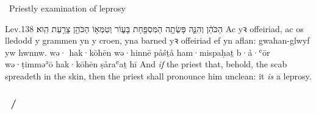 \begin{frame}{\ex\ Priestly examination of leprosy}
	\begin{example}{Lev.}{13}{8}{}{}
		\quoling
		{ הַכֹּהֵ֔ן וְהִנֵּ֛ה פָּשְׂתָ֥ה הַמִּסְפַּ֖חַת בָּע֑וֹר וְטִמְּא֥וֹ הַכֹּהֵ֖ן צָרַ֥עַת הִֽוא׃}
		{Ac  yꝛ offeiriad, ac os lledodd y grammen yn y croen, yna barned yꝛ offeiriad ef yn aflan: gwahan-glwyf yw hwnnw.}
		{wə· hak·kōhēn wə·hinnē påśṯå ham·mispaḥaṯ b·å·ʿōr wə·ṭimməʾō hak·kōhēn ṣåraʿaṯ hī}
		{And \emph{if} the priest  that, behold, the scab spreadeth in the skin, then the priest shall pronounce him unclean: it \emph{is} a leprosy.}
	\end{example}
\end{frame}


\subsubsection{}

\subsubsection{~/ }

\subsubsection{}

\subsubsection{}

\subsubsection{}


\subsubsection{}
